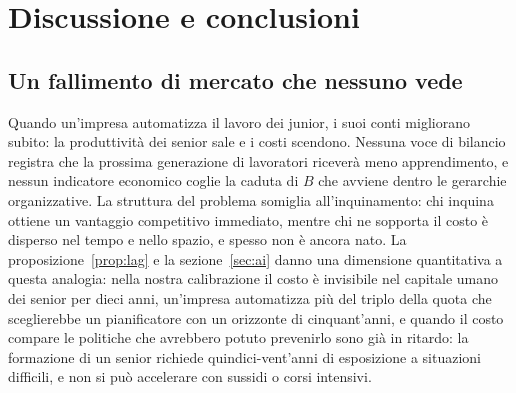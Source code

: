 \documentclass[preprint,12pt,authoryear]{elsarticle}
\begin{document}
\section{Discussione e conclusioni}\label{sec:conclusions}

\subsection{Un fallimento di mercato che nessuno vede}

Quando un'impresa automatizza il lavoro dei junior, i suoi conti migliorano subito: la produttività dei senior sale e i costi scendono. Nessuna voce di bilancio registra che la prossima generazione di lavoratori riceverà meno apprendimento, e nessun indicatore economico coglie la caduta di $B$ che avviene dentro le gerarchie organizzative. La struttura del problema somiglia all'inquinamento: chi inquina ottiene un vantaggio competitivo immediato, mentre chi ne sopporta il costo è disperso nel tempo e nello spazio, e spesso non è ancora nato. La proposizione~\ref{prop:lag} e la sezione~\ref{sec:ai} danno una dimensione quantitativa a questa analogia: nella nostra calibrazione il costo è invisibile nel capitale umano dei senior per dieci anni, un'impresa automatizza più del triplo della quota che sceglierebbe un pianificatore con un orizzonte di cinquant'anni, e quando il costo compare le politiche che avrebbero potuto prevenirlo sono già in ritardo: la formazione di un senior richiede quindici-vent'anni di esposizione a situazioni difficili, e non si può accelerare con sussidi o corsi intensivi.
\end{document}
